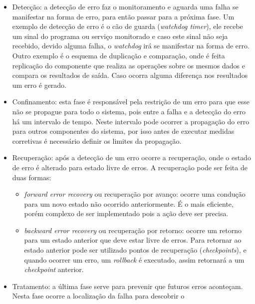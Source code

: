 
\begin{itemize}
 \item Detecção: a detecção de erro faz o monitoramento e aguarda uma falha se manifestar na forma de erro, para então
 passar para a próxima fase. Um exemplo de detecção de erro é o cão de guarda (\textit{watchdog timer}), ele recebe um sinal do programa ou 
 serviço monitorado e caso este sinal não seja recebido, devido alguma falha, o \textit{watchdog} irá se manifestar na forma de erro. 
 Outro exemplo é o esquema de duplicação e comparação, onde é feita replicação do componente que realiza as operações sobre os 
 mesmos dados e compara os resultados de saída. Caso ocorra alguma diferença nos resultados um erro é gerado.
 \item Confinamento: esta fase é responsável pela restrição de um erro para que esse não se propague para todo o sistema, pois entre a falha e a
 detecção do erro há um intervalo de tempo. Neste intervalo pode ocorrer a propagação do erro para outros componentes do sistema, por isso 
 antes de executar medidas corretivas é necessário definir os limites da propagação.
 \item Recuperação: após a detecção de um erro ocorre a recuperação, onde o estado de erro é alterado para estado livre de erros. A recuperação
 pode ser feita de duas formas:
 \begin{itemize}
  \item \textit{forward error recovery} ou recuperação por avanço: ocorre uma condução para um novo estado não ocorrido anteriormente. É o mais 
  eficiente, porém complexo de ser implementado pois a ação deve ser precisa.
  \item \textit{backward error recovery} ou recuperação por retorno: ocorre um retorno para um estado anterior que deve estar livre de erros.
  Para retornar ao estado anterior pode ser utilizado pontos de recuperação (\textit{checkpoints}), e quando ocorrer um erro, um \textit{rollback} 
  é executado, assim retornará a um \textit{checkpoint} anterior.
 \end{itemize}
 \item Tratamento: a última fase serve para prevenir que futuros erros aconteçam. Nesta fase ocorre a localização da falha para descobrir o 

\end{itemize}

